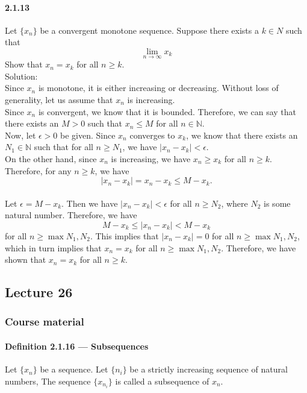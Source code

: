 \documentclass{article}
\begin{document}
\paragraph{2.1.13}
Let $\{x_n\}$ be a convergent monotone sequence. Suppose there exists a $k\in N$ such that $$\lim_{n\to \infty}{x_k}$$ Show that $x_n=x_k$ for all $n\geq k$.\\
Solution:\\
Since ${x_n}$ is monotone, it is either increasing or decreasing. Without loss of generality, let us assume that ${x_n}$ is increasing.\\
Since ${x_n}$ is convergent, we know that it is bounded. Therefore, we can say that there exists an $M>0$ such that $x_n\leq M$ for all $n\in \mathbb{N}$.\\
Now, let $\epsilon>0$ be given. Since ${x_n}$ converges to $x_k$, we know that there exists an $N_1\in \mathbb{N}$ such that for all $n\geq N_1$, we have $|x_n-x_k|<\epsilon$.\\
On the other hand, since ${x_n}$ is increasing, we have $x_n\geq x_k$ for all $n\geq k$. Therefore, for any $n\geq k$, we have $$|x_n-x_k|=x_n-x_k\leq M-x_k.$$\\
Let $\epsilon=M-x_k$. Then we have $|x_n-x_k|<\epsilon$ for all $n\geq N_2$, where $N_2$ is some natural number. Therefore, we have $$M-x_k\leq |x_n-x_k|< M-x_k$$ for all $n\geq \max{N_1,N_2}$. This implies that $|x_n-x_k|=0$ for all $n\geq \max{N_1,N_2}$, which in turn implies that $x_n=x_k$ for all $n\geq \max{N_1,N_2}$. Therefore, we have shown that $x_n=x_k$ for all $n\geq k$.
\subsection{Lecture 26}
\subsubsection{Course material}
\paragraph{Definition 2.1.16 — Subsequences}
Let $\{x_n\}$ be a sequence. Let $\{n_i\}$ be a strictly increasing sequence of natural numbers, The sequence $\{x_{n_{i}}\}$ is called a subsequence of ${x_n}$.
\end{document}
